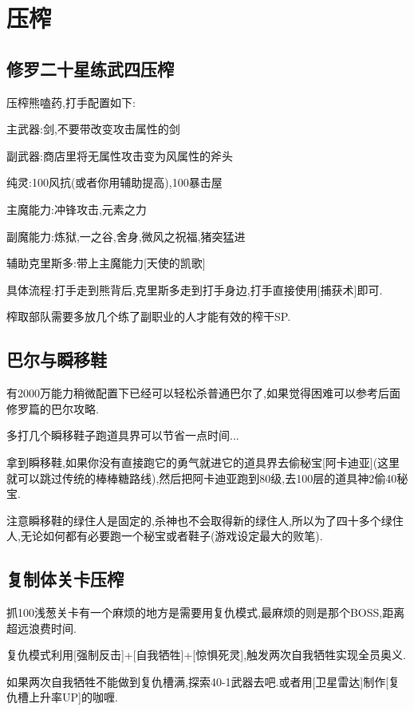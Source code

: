 \newpage

\section{压榨}

	\subsection{修罗二十星练武四压榨}

	压榨熊嗑药,打手配置如下:

	主武器:剑,不要带改变攻击属性的剑

	副武器:商店里将无属性攻击变为风属性的斧头

	纯灵:100风抗(或者你用辅助提高),100暴击屋

	主魔能力:冲锋攻击,元素之力

	副魔能力:炼狱,一之谷,舍身,微风之祝福,猪突猛进

	辅助克里斯多:带上主魔能力[天使的凯歌]
	
	具体流程:打手走到熊背后,克里斯多走到打手身边,打手直接使用[捕获术]即可.

	榨取部队需要多放几个练了副职业的人才能有效的榨干SP.

	\subsection{巴尔与瞬移鞋}

	有2000万能力稍微配置下已经可以轻松杀普通巴尔了,如果觉得困难可以参考后面修罗篇的巴尔攻略.

	多打几个瞬移鞋子跑道具界可以节省一点时间...

	拿到瞬移鞋,如果你没有直接跑它的勇气就进它的道具界去偷秘宝[阿卡迪亚](这里就可以跳过传统的棒棒糖路线),然后把阿卡迪亚跑到80级,去100层的道具神2偷40秘宝.

	注意瞬移鞋的绿住人是固定的,杀神也不会取得新的绿住人,所以为了四十多个绿住人,无论如何都有必要跑一个秘宝或者鞋子(游戏设定最大的败笔).

	\newpage
	
	\subsection{复制体关卡压榨}

	抓100浅葱关卡有一个麻烦的地方是需要用复仇模式,最麻烦的则是那个BOSS,距离超远浪费时间.

	复仇模式利用[强制反击]+[自我牺牲]+[惊惧死灵],触发两次自我牺牲实现全员奥义.

	如果两次自我牺牲不能做到复仇槽满,探索40-1武器去吧.或者用[卫星雷达]制作[复仇槽上升率UP]的咖喱.

